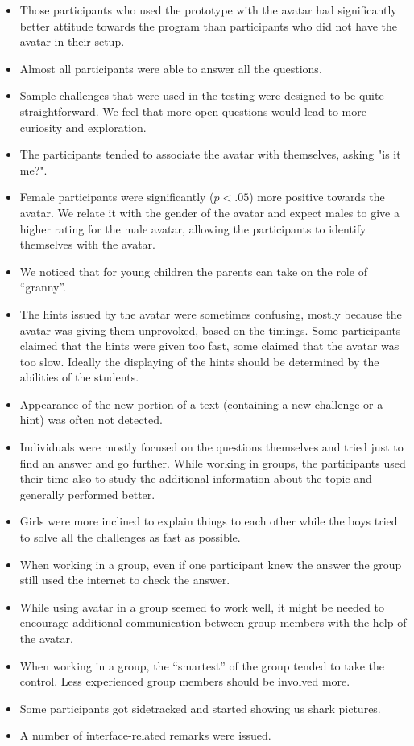 \documentclass[a4paper]{article}
\begin{document}
\begin{itemize}
	\item Those participants who used the prototype with the avatar had significantly better attitude towards the program than participants who did not have the avatar in their setup.
	\item Almost all participants were able to answer all the questions. 
	\item Sample challenges that were used in the testing were designed to be quite straightforward. We feel that more open questions would lead to more curiosity and exploration. 
	\item The participants tended to associate the avatar with themselves, asking "is it me?".
	\item Female participants were significantly ($p < .05$) more positive towards the avatar. We relate it with the gender of the avatar and expect males to give a higher rating for the male avatar, allowing the participants to identify themselves with the avatar.
	\item We noticed that for young children the parents can take on the role of “granny”.
	\item The hints issued by the avatar were sometimes confusing, mostly because the avatar was giving them unprovoked, based on the timings. Some participants claimed that the hints were given too fast, some claimed that the avatar was too slow. Ideally the displaying of the hints should be determined by the abilities of the students.
	\item Appearance of the new portion of a text (containing a new challenge or a hint) was often not detected.
	\item Individuals were mostly focused on the questions themselves and tried just to find an answer and go further. While working in groups, the participants used their time also to study the additional information about the topic and generally performed better.
	\item Girls were more inclined to explain things to each other while the boys tried to solve all the challenges as fast as possible.
	\item When working in a group, even if one participant knew the answer the group still used the internet to check the answer.
	\item While using avatar in a group seemed to work well, it might be needed to encourage additional communication between group members with the help of the avatar.
	\item When working in a group, the “smartest” of the group tended to take the control. Less experienced group members should be involved more.
	\item Some participants got sidetracked and started showing us shark pictures.
	\item A number of interface-related remarks were issued. 
\end{itemize}
\end{document}
